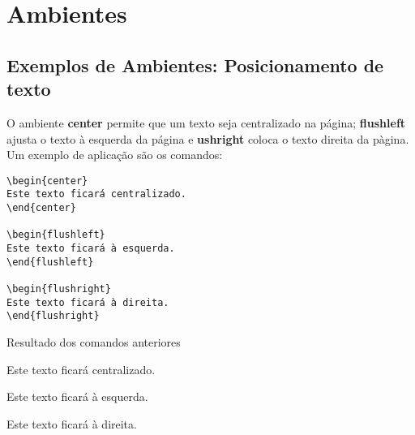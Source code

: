 \section{Ambientes}

\subsection*{Exemplos de Ambientes: Posicionamento de texto} %

\begin{frame}[fragile]
O ambiente {\bf center} permite que um texto seja centralizado na página;
{\bf flushleft} ajusta o texto à esquerda da página e {\bf ushright} coloca o texto
direita da pàgina. Um exemplo de aplicação são os comandos:
\begin{verbatim}
\begin{center}
Este texto ficará centralizado.
\end{center}

\begin{flushleft}
Este texto ficará à esquerda.
\end{flushleft}

\begin{flushright}
Este texto ficará à direita.
\end{flushright}
\end{verbatim}
\end{frame}


\begin{frame}
\begin{block}{Resultado dos comandos anteriores}
\end{block}

\begin{center}
Este texto ficará centralizado.
\end{center}

\begin{flushleft}
Este texto ficará à esquerda.
\end{flushleft}

\begin{flushright}
Este texto ficará à direita.
\end{flushright}
\end{frame}

